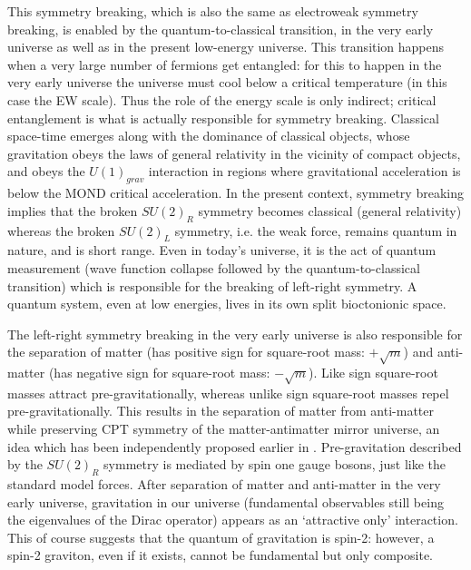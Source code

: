 \documentclass[a4paper]{jpconf}
\begin{document}
This symmetry breaking, which is also the same as electroweak symmetry breaking, is enabled by the quantum-to-classical transition, in the very early universe as well as in the present low-energy universe. This transition happens when a very large number of fermions get entangled: for this to happen in the very early universe the universe must cool below a critical temperature (in this case the EW scale). Thus the role of the energy scale is only indirect; critical entanglement is what is actually responsible for symmetry breaking. Classical space-time emerges along with the dominance of classical objects, whose gravitation obeys the laws of general relativity in the vicinity of compact objects, and obeys the $U(1)_{grav}$ interaction in regions where gravitational acceleration is below the MOND critical acceleration. In the present context,  symmetry breaking implies that the broken $SU(2)_R$ symmetry becomes classical (general relativity) whereas the broken $SU(2)_L$ symmetry, i.e. the weak force, remains quantum in nature, and is short range. Even in today's universe, it is the act of quantum measurement (wave function collapse followed by the quantum-to-classical transition) which is responsible for the breaking of left-right symmetry. A quantum system, even at low energies, lives in its own split bioctonionic space.

The left-right symmetry breaking in the very early universe is also responsible for the separation of matter (has positive sign for square-root mass: $+\sqrt{m}$) and anti-matter (has negative sign for square-root mass: $-\sqrt{m}$). Like sign square-root masses attract pre-gravitationally, whereas unlike sign square-root masses  repel pre-gravitationally. This results in the separation of matter from 
anti-matter while preserving CPT symmetry of the matter-antimatter mirror universe, an idea which has been independently proposed earlier in \cite{Turok}. Pre-gravitation described by the $SU(2)_R$ symmetry is mediated by spin one gauge bosons, just like the standard model forces. After separation of matter and anti-matter in the very early universe, gravitation in our universe (fundamental observables still being the eigenvalues of the Dirac operator) appears as an `attractive only' interaction. This of course suggests that the quantum of gravitation is spin-2: however, a spin-2 graviton, even if it exists, cannot be fundamental but only composite.
\end{document}
